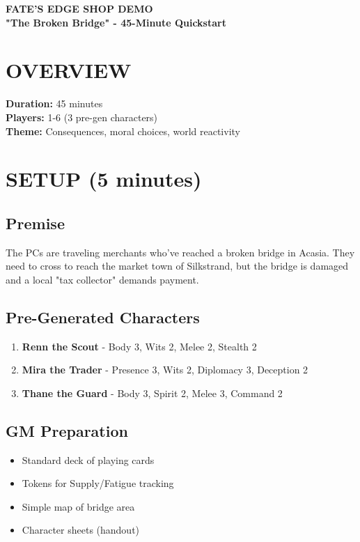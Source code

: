 \documentclass[12pt]{article}
\begin{document}
\begin{center}
{\LARGE \textbf{FATE'S EDGE SHOP DEMO}} \\
{\large \textbf{"The Broken Bridge" - 45-Minute Quickstart}}
\end{center}

\section*{OVERVIEW}

\textbf{Duration:} 45 minutes \\
\textbf{Players:} 1-6 (3 pre-gen characters) \\
\textbf{Theme:} Consequences, moral choices, world reactivity

\section{SETUP (5 minutes)}

\subsection*{Premise}
The PCs are traveling merchants who've reached a broken bridge in Acasia. They need to cross to reach the market town of Silkstrand, but the bridge is damaged and a local "tax collector" demands payment.

\subsection*{Pre-Generated Characters}
\begin{enumerate}
\item \textbf{Renn the Scout} - Body 3, Wits 2, Melee 2, Stealth 2
\item \textbf{Mira the Trader} - Presence 3, Wits 2, Diplomacy 3, Deception 2  
\item \textbf{Thane the Guard} - Body 3, Spirit 2, Melee 3, Command 2
\end{enumerate}

\subsection*{GM Preparation}
\begin{itemize}
\item Standard deck of playing cards
\item Tokens for Supply/Fatigue tracking
\item Simple map of bridge area
\item Character sheets (handout)
\end{itemize}
\end{document}
